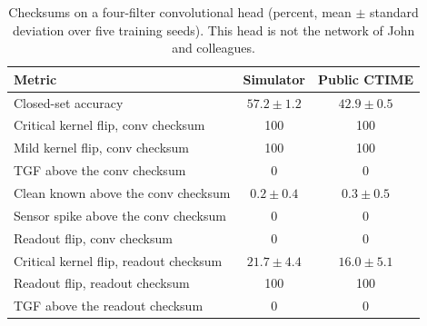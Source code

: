 \begin{table}[t]
\caption{Checksums on a four-filter convolutional head (percent, mean $\pm$ standard deviation over five training seeds). This head is not the network of John and colleagues.}
\label{tab:conv}
\centering
\small
\begin{tabular}{lcc}
\toprule
Metric & Simulator & Public CTIME \\
\midrule
Closed-set accuracy & $57.2 \pm 1.2$ & $42.9 \pm 0.5$ \\
Critical kernel flip, conv checksum & 100 & 100 \\
Mild kernel flip, conv checksum & 100 & 100 \\
TGF above the conv checksum & 0 & 0 \\
Clean known above the conv checksum & $0.2 \pm 0.4$ & $0.3 \pm 0.5$ \\
Sensor spike above the conv checksum & 0 & 0 \\
Readout flip, conv checksum & 0 & 0 \\
Critical kernel flip, readout checksum & $21.7 \pm 4.4$ & $16.0 \pm 5.1$ \\
Readout flip, readout checksum & 100 & 100 \\
TGF above the readout checksum & 0 & 0 \\
\bottomrule
\end{tabular}
\end{table}
